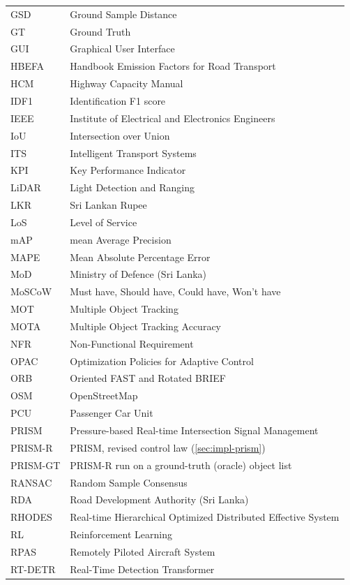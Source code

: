 \begin{longtable}{@{}p{}p{}@{}}
GSD & Ground Sample Distance\\
GT & Ground Truth\\
GUI & Graphical User Interface\\
HBEFA & Handbook Emission Factors for Road Transport\\
HCM & Highway Capacity Manual\\
IDF1 & Identification F1 score\\
IEEE & Institute of Electrical and Electronics Engineers\\
IoU & Intersection over Union\\
ITS & Intelligent Transport Systems\\
KPI & Key Performance Indicator\\
LiDAR & Light Detection and Ranging\\
LKR & Sri Lankan Rupee\\
LoS & Level of Service\\
mAP & mean Average Precision\\
MAPE & Mean Absolute Percentage Error\\
MoD & Ministry of Defence (Sri Lanka)\\
MoSCoW & Must have, Should have, Could have, Won't have\\
MOT & Multiple Object Tracking\\
MOTA & Multiple Object Tracking Accuracy\\
NFR & Non-Functional Requirement\\
OPAC & Optimization Policies for Adaptive Control\\
ORB & Oriented FAST and Rotated BRIEF\\
OSM & OpenStreetMap\\
PCU & Passenger Car Unit\\
PRISM & Pressure-based Real-time Intersection Signal Management\\
PRISM-R & PRISM, revised control law (\cref{sec:impl-prism})\\
PRISM-GT & PRISM-R run on a ground-truth (oracle) object list\\
RANSAC & Random Sample Consensus\\
RDA & Road Development Authority (Sri Lanka)\\
RHODES & Real-time Hierarchical Optimized Distributed Effective System\\
RL & Reinforcement Learning\\
RPAS & Remotely Piloted Aircraft System\\
RT-DETR & Real-Time Detection Transformer\\

\end{longtable}
